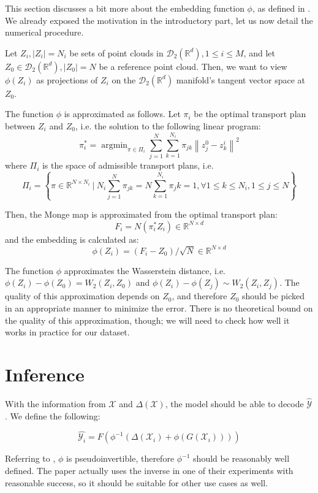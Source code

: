 \documentclass{article}
\newcommand{\norm}[1]{\left\lVert#1\right\rVert}
\DeclareMathOperator*{\argmin}{argmin} %
\begin{document}
This section discusses a bit more about the embedding function $\phi$, as defined in \cite{kolouri2020wasserstein}. We already exposed the motivation in the introductory part, let us now detail the numerical procedure.

Let $Z_i, |Z_i|=N_i$ be sets of point clouds in $\mathscr{D}_2({\mathbb{R}^d}), 1\leq i\leq M$, and let $Z_0\in \mathscr{D}_2({\mathbb{R}^d}), |Z_0| = N$ be a reference point cloud. Then, we want to view $\phi(Z_i)$ as projections of $Z_i$ on the $\mathscr{D}_2({\mathbb{R}^d})$ manifold's tangent vector space at $Z_0$.

The function $\phi$ is approximated as follows. Let $\pi_i$ be the optimal transport plan between $Z_i$ and $Z_0$, i.e. the solution to the following linear program:
\[\pi_i^* = \argmin_{\pi \in \Pi_i}\sum_{j=1}^N\sum_{k=1}^{N_i}\pi_{jk}\norm{z_j^0 - z_k^i}^2 \]
where $\Pi_i$ is the space of admissible transport plans, i.e.
\[\Pi_i = \left\{\pi\in\mathbb{R}^{N\times N_i}\ \bigg|\ N_i\sum_{j=1}^N\pi_{jk} = N\sum_{k=1}^{N_i}\pi_jk = 1, \forall 1\leq k\leq N_i, 1\leq j\leq N \right\} \]

Then, the Monge map is approximated from the optimal transport plan:
\[F_i = N(\pi_i^*Z_i) \in \mathbb{R}^{N\times d} \]
and the embedding is calculated as:
\[\phi(Z_i) = (F_i-Z_0)/\sqrt{N} \in \mathbb{R}^{N\times d} \]

The function $\phi$ approximates the Wasserstein distance, i.e. $\phi(Z_i) - \phi(Z_0) = W_2(Z_i, Z_0)$ and $\phi(Z_i) - \phi(Z_j) \sim W_2(Z_i, Z_j)$. The quality of this approximation depends on $Z_0$, and therefore $Z_0$ should be picked in an appropriate manner to minimize the error. There is no theoretical bound on the quality of this approximation, though; we will need to check how well it works in practice for our dataset.

\section{Inference}
With the information from $\mathcal{X}$ and $\Delta(\mathcal{X})$, the model should be able to decode $\hat{\mathcal{Y}}$. We define the following:

\[\hat{\mathcal{Y}_i} = F\left(\phi^{-1}\left(\Delta(\mathcal{X}_i) + \phi\left(G(\mathcal{X}_i)\right)\right)\right)\]

Referring to \cite{kolouri2020wasserstein}, $\phi$ is pseudoinvertible, therefore $\phi^{-1}$ should be reasonably well defined. The paper actually uses the inverse in one of their experiments with reasonable success, so it should be suitable for other use cases as well.
\end{document}
